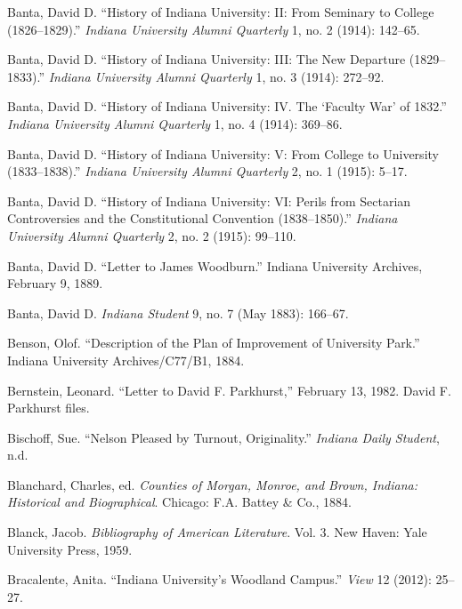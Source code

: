 \documentclass[
  american,
  letterpaper,
]{scrreprt}
\newlength{\cslhangindent}
\newenvironment{CSLReferences}[2] %
 {\begin{list}{}{%
  \setlength{\itemindent}{0pt}
  \setlength{\leftmargin}{0pt}
  \setlength{\parsep}{0pt}
  \ifodd #1
   \setlength{\leftmargin}{\cslhangindent}
   \setlength{\itemindent}{-1\cslhangindent}
  \fi
  \setlength{\itemsep}{#2\baselineskip}}}
 {\end{list}}
\begin{document}
\begin{CSLReferences}{1}{0}
Banta, David D. {``History of Indiana University: II: From Seminary to
College (1826--1829).''} \emph{Indiana University Alumni Quarterly} 1,
no. 2 (1914): 142--65.

Banta, David D. {``History of Indiana University: III: The New Departure
(1829--1833).''} \emph{Indiana University Alumni Quarterly} 1, no. 3
(1914): 272--92.

Banta, David D. {``{History of Indiana University: IV. The {`Faculty
War'} of 1832}.''} \emph{Indiana University Alumni Quarterly} 1, no. 4
(1914): 369--86.

Banta, David D. {``History of Indiana University: V: From College to
University (1833--1838).''} \emph{Indiana University Alumni Quarterly}
2, no. 1 (1915): 5--17.

Banta, David D. {``History of Indiana University: VI: Perils from
Sectarian Controversies and the Constitutional Convention
(1838--1850).''} \emph{Indiana University Alumni Quarterly} 2, no. 2
(1915): 99--110.

Banta, David D. {``Letter to James Woodburn.''} Indiana University
Archives, February 9, 1889.

Banta, David D. \emph{Indiana Student} 9, no. 7 (May 1883): 166--67.

Benson, Olof. {``Description of the Plan of Improvement of University
Park.''} Indiana University Archives/C77/B1, 1884.

Bernstein, Leonard. {``Letter to David {F.} Parkhurst,''} February 13,
1982. David F. Parkhurst files.

Bischoff, Sue. {``Nelson Pleased by Turnout, Originality.''}
\emph{Indiana Daily Student}, n.d.

Blanchard, Charles, ed. \emph{Counties of Morgan, Monroe, and Brown,
Indiana: Historical and Biographical}. Chicago: F.A. Battey \& Co.,
1884.

Blanck, Jacob. \emph{Bibliography of American Literature}. Vol. 3. New
Haven: Yale University Press, 1959.

Bracalente, Anita. {``Indiana University's Woodland Campus.''}
\emph{View} 12 (2012): 25--27.


\end{CSLReferences}
\end{document}
